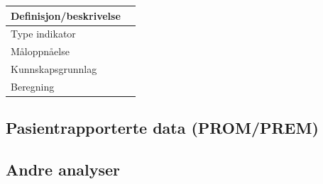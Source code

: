 \documentclass{article}
\begin{document}
    \begin{center}
        \begin{tabular}{|p{5cm}|p{8cm}|} \hline
        
            Definisjon/beskrivelse & \\ \hline
            
            Type indikator & \\ \hline
            
            Måloppnåelse & \\ \hline
            
            Kunnskapsgrunnlag & \\ \hline
            
            Beregning & \\ \hline
            
        \end{tabular}
    \end{center}
    
    \subsection{Pasientrapporterte data (PROM/PREM)}
    
    
    \subsection{Andre analyser}
\end{document}
